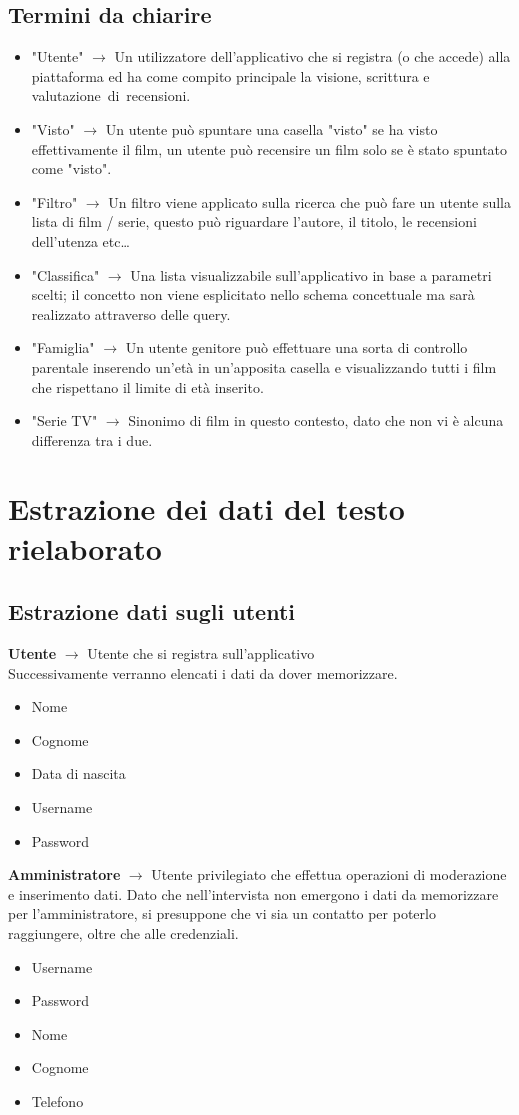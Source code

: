\documentclass[a4paper,12pt]{report}
\begin{document}
	\subsection{Termini da chiarire}\label{ss:terminologia}
	\begin{itemize}
		\item "Utente" $\longrightarrow$ Un utilizzatore dell'applicativo che si registra (o che accede) alla piattaforma ed ha come compito principale la visione, scrittura e valutazione di recensioni.
		\item "Visto" $\longrightarrow$ Un utente può spuntare una casella "visto" se ha visto effettivamente il film, un utente può recensire un film solo se è stato spuntato come "visto".
		\item "Filtro" $\longrightarrow$ Un filtro viene applicato sulla ricerca che può fare un utente sulla lista di film / serie, questo può riguardare l'autore, il titolo, le recensioni dell'utenza etc\dots
		\item "Classifica" $\longrightarrow$ Una lista visualizzabile sull'applicativo in base a parametri scelti; il concetto non viene esplicitato nello schema concettuale ma sarà realizzato attraverso delle query.
		\item "Famiglia" $\longrightarrow$ Un utente genitore può effettuare una sorta di controllo parentale inserendo un'età in un'apposita casella e visualizzando tutti i film che rispettano il limite di età inserito.
		\item "Serie TV" $\longrightarrow$ Sinonimo di film in questo contesto, dato che non vi è alcuna differenza tra i due.
	\end{itemize}
	\section{Estrazione dei dati del testo rielaborato}
	\subsection{Estrazione dati sugli utenti}
	\textbf{Utente} $\longrightarrow$ Utente che si registra sull'applicativo\\Successivamente verranno elencati i dati da dover memorizzare.
	\begin{itemize}
		\item Nome
		\item Cognome
		\item Data di nascita
		\item Username
		\item Password
	\end{itemize}
	\textbf{Amministratore} $\longrightarrow$ Utente privilegiato che effettua operazioni di moderazione e inserimento dati. Dato che nell'intervista non emergono i dati da memorizzare per l'amministratore, si presuppone che vi sia un contatto per poterlo raggiungere, oltre che alle credenziali.
	\begin{itemize}
		\item Username
		\item Password
		\item Nome
		\item Cognome
		\item Telefono
	\end{itemize}
\end{document}
